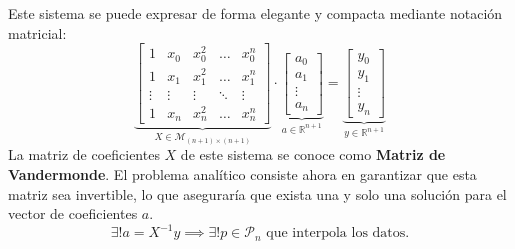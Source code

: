 Este sistema se puede expresar de forma elegante y compacta mediante notación matricial:
\[
    \underbrace{
    \begin{bmatrix}
        1 & x_0 & x_0^2 & \ldots & x_0^n \\
        1 & x_1 & x_1^2 & \ldots & x_1^n \\
        \vdots & \vdots & \vdots & \ddots & \vdots \\
        1 & x_n & x_n^2 & \ldots & x_n^n
    \end{bmatrix}
    }_{X \in \mathcal{M}_{(n+1) \times (n+1)}}
    \cdot
    \underbrace{
    \begin{bmatrix}
        a_0 \\
        a_1 \\
        \vdots \\
        a_n
    \end{bmatrix}
    }_{a \in \mathbb{R}^{n+1}}
    =
    \underbrace{
    \begin{bmatrix}
        y_0 \\
        y_1 \\
        \vdots \\
        y_n
    \end{bmatrix}
    }_{y \in \mathbb{R}^{n+1}}
\]
La matriz de coeficientes $X$ de este sistema se conoce como \textbf{Matriz de Vandermonde}. El problema analítico consiste ahora en garantizar que esta matriz sea invertible, lo que aseguraría que exista una y solo una solución para el vector de coeficientes $a$.
\[
    \exists ! a = X^{-1} y \implies \exists ! p \in \mathcal{P}_n \text{ que interpola los datos.}
\]

